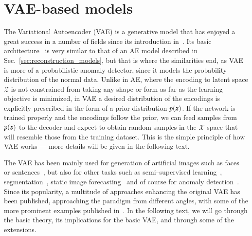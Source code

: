 \section{VAE-based models} \label{sec:vae_models}
The Variational Autoencoder (VAE) is a generative model that has enjoyed a great success in a number of fields since its introduction in~\cite{kingma2013vae}. Its basic architecture~\cite{kingma2019introduction} is very similar to that of an AE model described in Sec.~\ref{sec:reconstruction_models}, but that is where the similarities end, as VAE is more of a probabilistic anomaly detector, since it models the probability distribution of the normal data. Unlike in AE, where the encoding to latent space $\mathcal{Z}$ is not constrained from taking any shape or form as far as the learning objective is minimized, in VAE a desired distribution of the encodings is explicitly prescribed in the form of a prior distribution $p(\pmb{{z}})$. If the network is trained properly and the encodings follow the prior, we can feed samples from $p(\pmb{{z}})$ to the decoder and expect to obtain random samples in the $\mathcal{X}$ space that will resemble those from the training dataset. This is the simple principle of how VAE works --- more details will be given in the following text.

The VAE has been mainly used for generation of artificial images such as faces~\cite{rezende2014stochastic} or sentences~\cite{bowman2015generating}, but also for other tasks such as semi--supervised learning~\cite{kingma2014semi}, segmentation~\cite{sohn2015learning}, static image forecasting~\cite{walker2016uncertain} and of course for anomaly detection~\cite{an2015variational,xu2018unsupervised,solch2016variational}. Since its popularity, a multitude of approaches enhancing the original VAE has been published, approaching the paradigm from different angles, with some of the more prominent examples published in~\cite{higgins2017beta,zhao2017infovae,tolstikhin2017wasserstein,makhzani2015adversarial,pu2017adversarial}. In the following text, we will go through the basic theory, its implications for the basic VAE, and through some of the extensions. 

